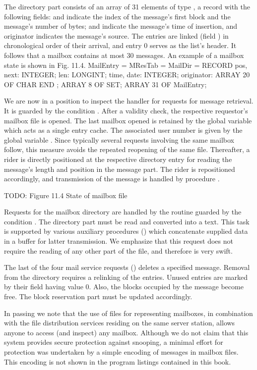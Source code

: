 The directory part consists of an array of 31 elements of type , a record with the following fields:  and  indicate the index of the message's first block and the message's number of bytes;  and  indicate the message's time of insertion, and originator indicates the message's source. The entries are linked (field ) in chronological order of their arrival, and entry 0 serves as the list's header. It follows that a mailbox contains at most 30 messages. An example of a mailbox state is shown in Fig. 11.4.
\begintt
MailEntry =
MResTab = MailDir =
RECORD
pos, next: INTEGER;
len: LONGINT;
time, date: INTEGER; originator: ARRAY 20 OF CHAR
END ;
ARRAY 8 OF SET; ARRAY 31 OF MailEntry;
\endtt

\noindent We are now in a position to inspect the handler for requests for message retrieval. It is guarded by the condition . After a validity check, the respective requestor's mailbox file is opened. The last mailbox opened is retained by the global variable  which acts as a single entry cache. The associated user number is given by the global variable . Since typically several requests involving the same mailbox follow, this measure avoids the repeated reopening of the same file. Thereafter, a rider is directly positioned at the respective directory entry for reading the message's length and position in the message part. The rider is repositioned accordingly, and transmission of the message is handled by procedure .

TODO: Figure 11.4 State of mailbox file

Requests for the mailbox directory are handled by the routine guarded by the condition . The directory part must be read and converted into a text. This task is supported by various auxiliary procedures () which concatenate supplied data in a buffer for latter transmission. We emphasize that this request does not require the reading of any other part of the file, and therefore is very swift.

The last of the four mail service requests () deletes a specified message. Removal from the directory requires a relinking of the entries. Unused entries are marked by their  field having value 0. Also, the blocks occupied by the message become free. The block reservation part must be updated accordingly.

In passing we note that the use of files for representing mailboxes, in combination with the file distribution services residing on the same server station, allows anyone to access (and inspect) any mailbox. Although we do not claim that this system provides secure protection against snooping, a minimal effort for protection was undertaken by a simple encoding of messages in mailbox files. This encoding is not shown in the program listings contained in this book.


